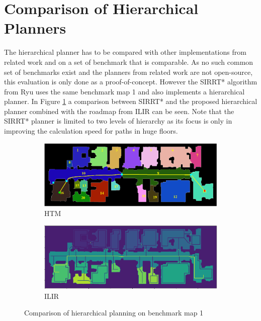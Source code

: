 \section{Comparison of Hierarchical Planners}
\label{sec:evaluation_hierarchical}
The hierarchical planner has to be compared with other implementations from related work and on a set of benchmark that is comparable. As no such common set of benchmarks exist and the planners from related work are not open-source, this evaluation is only done as a proof-of-concept. However the SIRRT* algorithm from Ryu \cite{ryu_hierarchical_2020} uses the same benchmark map 1 and also implements a hierarchical planner. In Figure \ref{fig:ryu_floor_comparison} a comparison between SIRRT* and the proposed hierarchical planner combined with the roadmap from ILIR can be seen. Note that the SIRRT* planner is limited to two levels of hierarchy as its focus is only in improving the calculation speed for paths in huge floors. 

\begin{figure}[h]
    \captionsetup[subfigure]{justification=centering}
    \centering
    \begin{subfigure}{0.75\textwidth}
      \centering
      \includegraphics[width=\textwidth]{figures/60_results/ryu_example_path_htm.png}
      \caption{HTM}
    \end{subfigure}
    \begin{subfigure}{0.75\textwidth}
      \centering
      \includegraphics[width=\textwidth]{figures/60_results/ryu_example_path_ilir.png}
      \caption{ILIR}
    \end{subfigure}
    \caption[Comparison of hierarchical planning on benchmark map 1]{Comparison of hierarchical planning on benchmark map 1}
    \label{fig:ryu_floor_comparison}
\end{figure}

